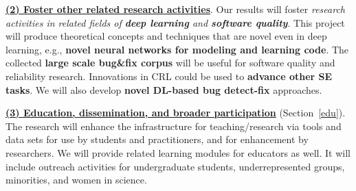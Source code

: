 \noindent\underline{{\bf (2) Foster other related research activities}}. Our results will
foster {\em research activities in related fields of {\bf deep
    learning} and {\bf software quality}}. This project will produce
theoretical concepts and techniques that are novel even in deep
learning, e.g., {\bf novel neural networks for modeling and learning
  code}.  The collected {\bf large scale bug\&fix corpus} will be useful for
software quality and reliability research. Innovations in CRL could be
used to {\bf advance other SE tasks}. We will also develop {\bf novel DL-based bug detect-fix} approaches.

\noindent\underline{{\bf (3) Education, dissemination, and broader participation}} (Section~\ref{edu}). The
research will enhance the infrastructure for teaching/research via
tools and data sets for use by students and practitioners, and for
enhancement by researchers. We will provide related learning
modules for educators as well. It will include outreach activities for
undergraduate students, underrepresented groups, minorities, and women
in science.


